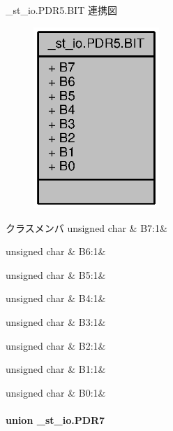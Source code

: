 \+\_\+st\+\_\+io.\+P\+D\+R5.\+B\+I\+T 連携図
\nopagebreak
\begin{figure}[H]
\begin{center}
\leavevmode
\includegraphics[width=135pt]{db/d8d/struct__st__io_8PDR5_8BIT__coll__graph}
\end{center}
\end{figure}
\begin{DoxyFields}{クラスメンバ}
unsigned char\label{3694s_8h_ad8498108dd603522047564a8da7be94c}
&
B7\+:1&
\\
\hline

unsigned char\label{3694s_8h_a68b1f1cc15d8987eafe633c9488bdc05}
&
B6\+:1&
\\
\hline

unsigned char\label{3694s_8h_a2a1ab298edf0162a3305e599b47cbeee}
&
B5\+:1&
\\
\hline

unsigned char\label{3694s_8h_ad5d4cc7b09d1843517acc9361f8f665e}
&
B4\+:1&
\\
\hline

unsigned char\label{3694s_8h_a0c4ecd7b59ebc5b9f47974cb9845fd02}
&
B3\+:1&
\\
\hline

unsigned char\label{3694s_8h_abbd97b00c539801e32317ab550867ec4}
&
B2\+:1&
\\
\hline

unsigned char\label{3694s_8h_ac9512565ef6194ca664dc41ec0de7a53}
&
B1\+:1&
\\
\hline

unsigned char\label{3694s_8h_a4c769c2c9989abb9fa024ab9930270e5}
&
B0\+:1&
\\
\hline

\end{DoxyFields}
\label{union__st__io_8PDR7}
\paragraph{union \+\_\+st\+\_\+io.\+P\+D\+R7}


